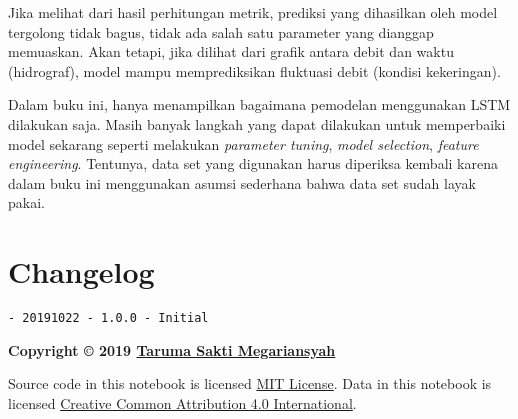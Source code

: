 \documentclass[11pt]{article}
\let\oldsection\section
\renewcommand\section{\clearpage\oldsection}
\begin{document}
    Jika melihat dari hasil perhitungan metrik, prediksi yang dihasilkan
oleh model tergolong tidak bagus, tidak ada salah satu parameter yang
dianggap memuaskan. Akan tetapi, jika dilihat dari grafik antara debit
dan waktu (hidrograf), model mampu memprediksikan fluktuasi debit
(kondisi kekeringan).

Dalam buku ini, hanya menampilkan bagaimana pemodelan menggunakan LSTM
dilakukan saja. Masih banyak langkah yang dapat dilakukan untuk
memperbaiki model sekarang seperti melakukan \emph{parameter tuning},
\emph{model selection}, \emph{feature engineering}. Tentunya, data set
yang digunakan harus diperiksa kembali karena dalam buku ini menggunakan
asumsi sederhana bahwa data set sudah layak pakai.

    \hypertarget{changelog}{%
\section{Changelog}\label{changelog}}

\begin{verbatim}
- 20191022 - 1.0.0 - Initial
\end{verbatim}

\textbf{Copyright © 2019 \href{https://taruma.github.io}{Taruma Sakti
Megariansyah}}

Source code in this notebook is licensed
\href{https://github.com/taruma/vivaldi/blob/master/LICENSE}{MIT
License}. Data in this notebook is licensed
\href{https://creativecommons.org/licenses/by/4.0/}{Creative Common
Attribution 4.0 International}.


    
    
    
\end{document}
